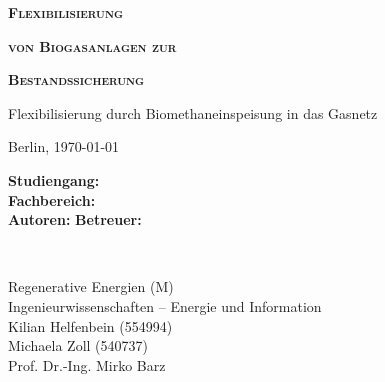 \begin{titlepage}
	\begin{center}
		
		\vspace*{1cm}
		
		\textbf{\textsc{{\huge Flexibilisierung}}}
		
		\vspace{0.3cm}

		\textbf{\textsc{{\huge von Biogasanlagen zur}}}
		
		\vspace{0.3cm}

		\textbf{\textsc{{\huge Bestandssicherung}}}
 
		\vspace{0.5cm}

		{\Large Flexibilisierung durch Biomethaneinspeisung in das Gasnetz}
 
		\vspace{2cm}
		
		Berlin, \today
       
       
 
		\vfill
 
		\vspace{0.8cm}
 
		\begin{minipage}{0.4\textwidth}
			\begin{flushleft}
				\textbf{Studiengang:}\\
				\textbf{Fachbereich:}\\
				\textbf{Autoren:}\newline\newline
				\textbf{Betreuer:}\\
			\end{flushleft}
		\end{minipage}~
		\begin{minipage}{0.4\textwidth}            
			\begin{flushright}
				Regenerative Energien (M)\\
				Ingenieurwissenschaften – Energie und Information\\
				Kilian Helfenbein (554994)\\
				Michaela Zoll (540737)\\ 
				Prof. Dr.-Ing. Mirko Barz\\
			\end{flushright}        
		\end{minipage}\\[2 cm]
		
	\end{center}
\end{titlepage}